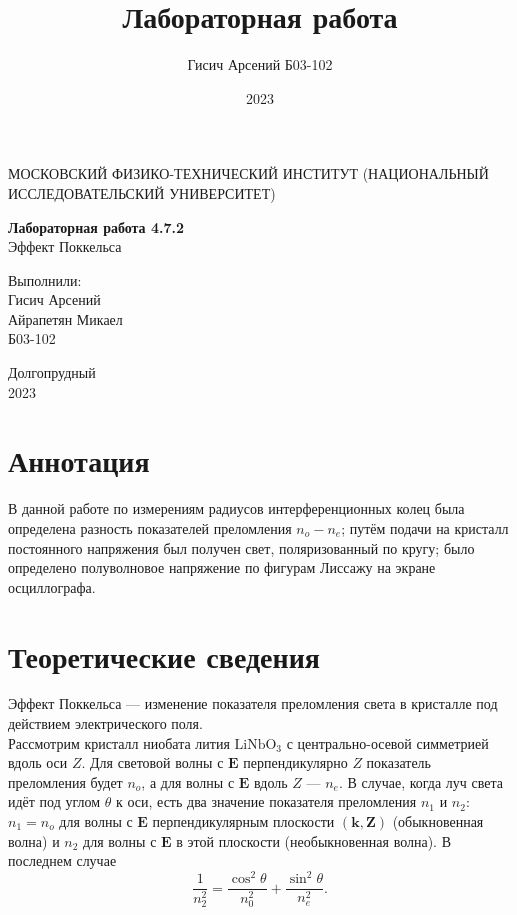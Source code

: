 \documentclass[a4paper, 12pt]{article}
\title{Лабораторная работа}
\author{Гисич Арсений Б03-102}
\date{2023}
\begin{document}
	\begin{center}
		{\large МОСКОВСКИЙ ФИЗИКО-ТЕХНИЧЕСКИЙ ИНСТИТУТ (НАЦИОНАЛЬНЫЙ ИССЛЕДОВАТЕЛЬСКИЙ УНИВЕРСИТЕТ)}
	\end{center}
	\vspace{5 cm}
	{\Large
		\begin{center}
			{\bf Лабораторная работа 4.7.2}\\[0.2 cm]
			Эффект Поккельса
		\end{center}
	}
	\vspace{4 cm}
	\begin{flushright}
		{\Large Выполнили: \\
			\vspace{0.2 cm}
			Гисич Арсений \\
                Айрапетян Микаел \\ 
			\vspace{0.2 cm}
			Б03-102 \\}
	\end{flushright}
	\vspace{8 cm}
	\begin{center}
		Долгопрудный\\[0.1 cm]
		2023
	\end{center}
\thispagestyle{empty}

\section{Аннотация}

В данной работе по измерениям радиусов интерференционных колец была определена разность показателей преломления $n_o - n_e$; путём подачи на кристалл постоянного напряжения был получен свет, поляризованный по кругу; было определено полуволновое напряжение по фигурам Лиссажу на экране осциллографа.

\section{Теоретические сведения}

Эффект Поккельса --- изменение показателя преломления света в кристалле под действием электрического поля.\\
Рассмотрим кристалл ниобата лития $\text{LiNbO}_3$ с центрально-осевой симметрией вдоль оси $Z$. Для световой волны с $\mathbf{E}$ перпендикулярно $Z$ показатель преломления будет $n_o$, а для волны с $\mathbf{E}$ вдоль $Z$ --- $n_e$. В случае, когда луч света идёт под углом $\theta$ к оси, есть два значение показателя преломления $n_1$ и $n_2$: $n_1 = n_o$ для волны с $\mathbf{E}$ перпендикулярным плоскости $(\mathbf{k},\mathbf{Z})$ (обыкновенная волна) и $n_2$ для волны с $\mathbf{E}$ в этой плоскости (необыкновенная волна). В последнем случае
\begin{equation}
\dfrac{1}{n_2^2}=\dfrac{\cos^2 \theta}{n_0^2}+\dfrac{\sin^2 \theta}{n_e^2}.
\end{equation}
\end{document}

